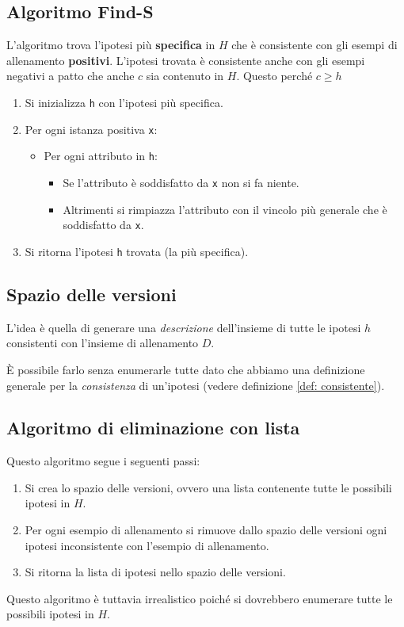 \subsection{Algoritmo Find-S}
L'algoritmo trova l'ipotesi pi\`u \textbf{specifica} in $H$ che \`e consistente con gli esempi di allenamento
\textbf{positivi}. L'ipotesi trovata \`e consistente anche con gli esempi negativi a patto che anche $c$ sia
contenuto in $H$. Questo perch\'e $c \geq h$
\begin{enumerate}
	\item Si inizializza \verb|h| con l'ipotesi pi\`u specifica.
	\item Per ogni istanza positiva \verb|x|:
	      \begin{itemize}
		      \item Per ogni attributo in \verb|h|:
		            \begin{itemize}
			            \item Se l'attributo \`e soddisfatto da \verb|x| non si fa niente.
			            \item Altrimenti si rimpiazza l'attributo con il vincolo pi\`u generale che \`e soddisfatto da
			                  \verb|x|.
		            \end{itemize}
	      \end{itemize}
	\item Si ritorna l'ipotesi \verb|h| trovata (la pi\`u specifica).
\end{enumerate}

\subsection{Spazio delle versioni}
L'idea \`e quella di generare una \emph{descrizione} dell'insieme di tutte le ipotesi $h$ consistenti con l'insieme di
allenamento $D$.

\`E possibile farlo senza enumerarle tutte dato che abbiamo una definizione generale per la \emph{consistenza} di
un'ipotesi (vedere definizione \ref{def: consistente}).

\subsection{Algoritmo di eliminazione con lista}
Questo algoritmo segue i seguenti passi:
\begin{enumerate}
	\item Si crea lo spazio delle versioni, ovvero una lista contenente tutte le possibili ipotesi in $H$.
	\item Per ogni esempio di allenamento si rimuove dallo spazio delle versioni ogni ipotesi inconsistente con l'esempio
	      di allenamento.
	\item Si ritorna la lista di ipotesi nello spazio delle versioni.
\end{enumerate}
Questo algoritmo \`e tuttavia irrealistico poich\'e si dovrebbero enumerare tutte le possibili ipotesi in $H$.

